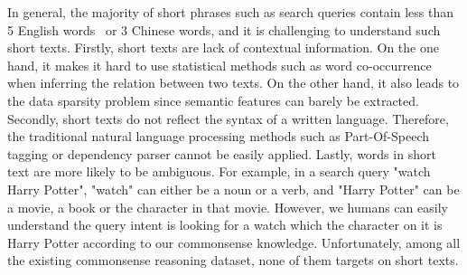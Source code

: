 






In general, the majority of short phrases such as search queries contain less than 5
English words~\cite{hua2015short} or 3 Chinese words,
and it is challenging to understand such short texts. %
Firstly, short texts are lack of contextual information. On the one hand, it makes it hard
to use statistical methods such as word co-occurrence when inferring the relation between two texts. On the other hand,
it also leads to the data sparsity problem since 
semantic features can barely be extracted. 
Secondly, short texts do not reflect the syntax of a written language. 
Therefore, the traditional natural language processing methods such as Part-Of-Speech tagging or dependency parser %
cannot be easily applied. 
Lastly, words in short text are more likely to be ambiguous. For example, in a search query "watch Harry Potter", %
"watch" can either be a noun or a verb, and 
"Harry Potter" can be a movie, a book or the character in that movie. 
However, we humans can easily understand the query intent is looking for a watch which the character on it is Harry Potter according to our commonsense knowledge.
Unfortunately, among all the existing commonsense reasoning dataset, none of them targets on short texts.%

